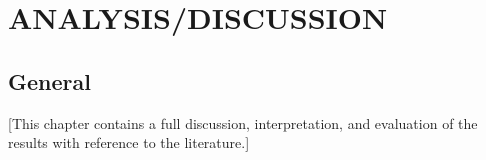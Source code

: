 ﻿\chapter{ANALYSIS/DISCUSSION}
\section{General}
[This chapter contains a full discussion, interpretation, and evaluation of the results with reference to the literature.]
